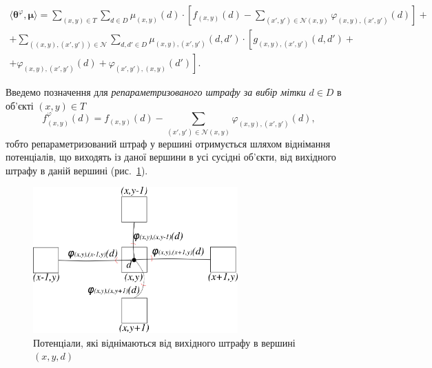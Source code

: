 \begin{equation} \label{eq:grouped:for:reparametrization}
\begin{gathered}
    \langle \pmb{\theta}^{\varphi}, \pmb{\mu} \rangle =
    \sum \limits_{\left(x, y \right) \in T}
        \sum \limits_{d \in D}
            \mu_{\left(x, y \right)} \left(d \right) \cdot \left[
                f_{\left(x, y \right)} \left(d \right) -
                \sum \limits_{\left(x', y' \right) \in \mathcal{N} \left(x, y \right)}
                    \varphi_{\left(x, y \right), \left(x', y' \right)} \left(
                        d
                    \right)
            \right] + \\
    + \sum \limits_{\left(\left(x, y \right), \left(x', y' \right)\right)\in \mathcal{N}}
        \sum \limits_{d, d' \in D}
             \mu_{\left(x, y \right), \left(x', y' \right)} \left(d, d' \right)
             \cdot \left[
                g_{\left(x, y \right), \left(x', y' \right)} \left(d, d' \right) + \right. \\
                + \left. \varphi_{\left(x, y \right), \left(x', y' \right)} \left(
                    d
                \right) +
                \varphi_{\left(x', y' \right), \left(x, y \right)} \left(
                    d'
                \right)
             \right].
\end{gathered}
\end{equation}

Введемо позначення для \textit{репараметризованого штрафу за вибір мітки}
$d \in D$ в об'єкті $\left(x, y \right) \in T$
\begin{equation} \label{eq:reparametrized:vertex}
    f_{\left(x, y \right)}^{\varphi} \left(d \right) =
    f_{\left(x, y \right)} \left(d \right) -
    \sum \limits_{\left(x', y' \right) \in \mathcal{N} \left(x, y \right)}
        \varphi_{\left(x, y \right), \left(x', y' \right)} \left(
            d
        \right),
\end{equation}
тобто репараметризований
штраф у вершині отримується шляхом віднімання потенціалів,
що виходять із даної вершини в усі сусідні об'єкти,
від вихідного штрафу в даній вершині (рис.~\ref{fig:reparametrized:vertex:weight}).

\begin{figure}[h]
  \centering
  \includegraphics[width=0.7\textwidth]{images/reparametrized_vertex_weight}
  \caption{Потенціали, які віднімаються від вихідного штрафу в вершині $\left(x, y, d \right)$}
  \label{fig:reparametrized:vertex:weight}
\end{figure}

